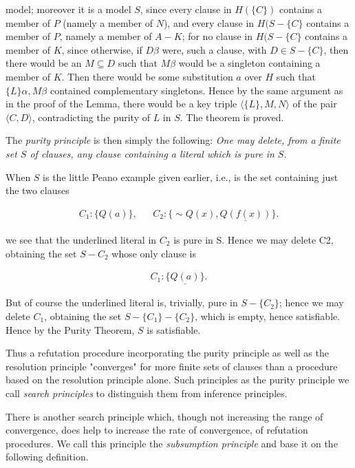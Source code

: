\documentclass[8pt]{extarticle}
\begin{document}
\newpage
model; moreover it is a model $S$, since every clause in $H(\{C\})$ contains a member of $P$ (namely a member of $N$), and every clause in $H(S - \{C\}$ contains a member of $P$, namely a member of $A - K$; for no clause in $H(S - \{C\}$ contains a member of $K$, since otherwise, if $D\beta$ were, such a clause, with $D \in S - \{C\}$, then there would be an $M\subseteq D$ such that $M\beta$ would be a singleton containing a member of $K$. Then there would be some substitution $a$ over $H$ such that $\{L\}\alpha, M\beta$ contained complementary singletons. Hence by the same argument as in the proof of the Lemma, there would be a key triple $\langle\{L\}, M, N\rangle$ 
of the pair $\langle C,D\rangle$, contradicting the purity of $L$ in $S$. The theorem is proved.

The \emph{purity principle} is then simply the following: \emph{One may delete, from a finite set $S$ of clauses, any clause containing a literal which is pure in $S$.}

When $S$ is the little Peano example given earlier, i.e., is the set containing just the two clauses

\begin{align*}
    C_1 : \{Q(a)\}, && C_2 : \{\sim Q(x), \underline{Q(f(x))}\}.
\end{align*}

we see that the underlined literal in $C_2$ is pure in S. Hence we may delete C2, obtaining the set $S - {C_2}$ whose only clause is

\begin{align*}
    C_1 : \{\underline{Q(a)}\}.
\end{align*}

But of course the underlined literal is, trivially, pure in $S - \{C_2\}$; hence we may delete $C_1$, obtaining the set $S - \{C_1\} - \{C_2\}$, which is empty, hence satisfiable. Hence by the Purity Theorem, $S$ is satisfiable. 

Thus a refutation procedure incorporating the purity principle as well as the resolution principle "converges" for more finite sets of clauses than a procedure based on the resolution principle alone. Such principles as the purity principle we call \emph{search principles} to distinguish them from inference principles.

There is another search principle which, though not increasing the range of convergence, does help to increase the rate of convergence, of refutation procedures. We call this principle the \emph{subsumption principle} and base it on the following definition.
\end{document}
